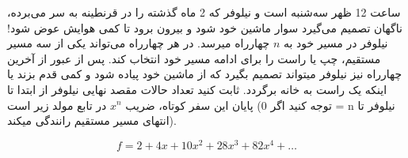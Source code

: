 \documentclass[12pt,onecolumn,a4paper]{article}
\begin{document}
    ساعت 12 ظهر سه‌شنبه است و نیلوفر که 2 ماه گذشته را در قرنطینه به سر می‌برده، ناگهان تصمیم می‌گیرد سوار ماشین خود شود و بیرون برود تا کمی هوایش عوض شود!
    نیلوفر در مسیر خود به
    $n$
    چهارراه میرسد.
    در هر چهارراه می‌تواند یکی از سه مسیر مستقیم، چپ یا راست را برای ادامه مسیر خود انتخاب کند. پس از عبور از آخرین چهارراه نیز نیلوفر میتواند تصمیم بگیرد که از ماشین خود پیاده شود و کمی قدم بزند یا اینکه یک راست به خانه برگردد. ثابت کنید تعداد حالات مقصد نهایی نیلوفر از ابتدا تا پایان این سفر کوتاه، ضریب
    $x^n$
    در تابع مولد زیر است
    (توجه کنید اگر 0 = n نیلوفر تا انتهای مسیر مستقیم رانندگی میکند).
    
    $$f = 2 + 4x + 10x^2 + 28x^3 + 82x^4 + \ldots$$
\end{document}
